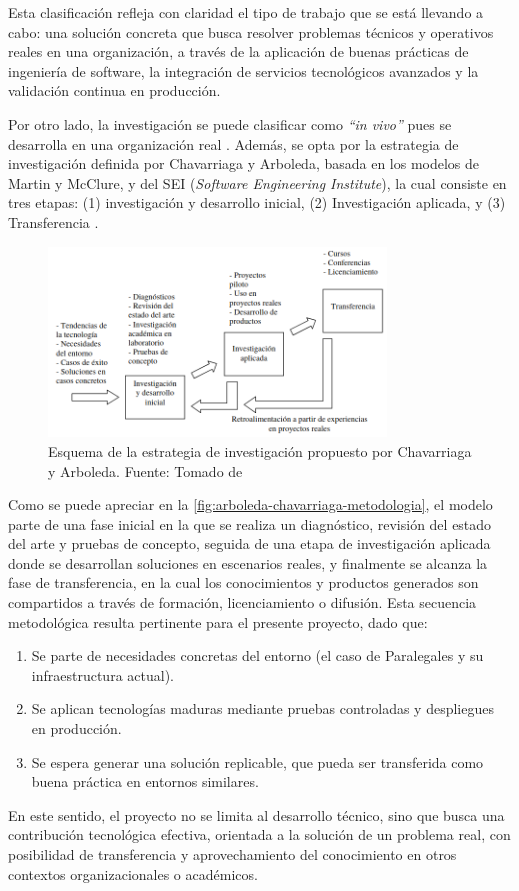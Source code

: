 Esta clasificación refleja con claridad el tipo de trabajo que se está llevando a cabo: una solución concreta que busca resolver problemas técnicos y operativos reales en una organización, a través de la aplicación de buenas prácticas de ingeniería de software, la integración de servicios tecnológicos avanzados y la validación continua en producción.

Por otro lado, la investigación se puede clasificar como \textit{``in vivo''} pues se desarrolla en una organización real \cite{ChavarriagaLIDIS}. Además, se opta por la estrategia de investigación definida por Chavarriaga y Arboleda, basada en los modelos de Martin y McClure, y del SEI (\textit{Software Engineering Institute}), la cual consiste en tres etapas: (1) investigación y desarrollo inicial, (2) Investigación aplicada, y (3) Transferencia \cite{ChavarriagaLIDIS,ChavarriagaModelo}.

\begin{figure}[H]
  \centering
  \includegraphics[width=0.8\textwidth]{img/figures/fig9-chavarriaga-arboleda.png}
  \caption{Esquema de la estrategia de investigación propuesto por Chavarriaga y Arboleda. Fuente: Tomado de \cite{ChavarriagaLIDIS}}
  \label{fig:arboleda-chavarriaga-metodologia}
\end{figure}

Como se puede apreciar en la \autoref{fig:arboleda-chavarriaga-metodologia}, el modelo parte de una fase inicial en la que se realiza un diagnóstico, revisión del estado del arte y pruebas de concepto, seguida de una etapa de investigación aplicada donde se desarrollan soluciones en escenarios reales, y finalmente se alcanza la fase de transferencia, en la cual los conocimientos y productos generados son compartidos a través de formación, licenciamiento o difusión. Esta secuencia metodológica resulta pertinente para el presente proyecto, dado que:

\begin{enumerate}
  \item Se parte de necesidades concretas del entorno (el caso de Paralegales y su infraestructura actual).
  \item Se aplican tecnologías maduras mediante pruebas controladas y despliegues en producción.
  \item Se espera generar una solución replicable, que pueda ser transferida como buena práctica en entornos similares.
\end{enumerate}

En este sentido, el proyecto no se limita al desarrollo técnico, sino que busca una contribución tecnológica efectiva, orientada a la solución de un problema real, con posibilidad de transferencia y aprovechamiento del conocimiento en otros contextos organizacionales o académicos.
